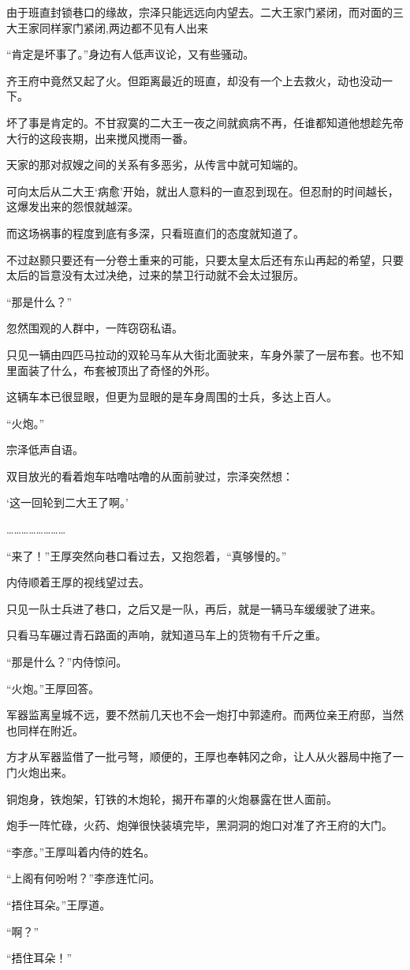 由于班直封锁巷口的缘故，宗泽只能远远向内望去。二大王家门紧闭，而对面的三大王家同样家门紧闭,两边都不见有人出来

“肯定是坏事了。”身边有人低声议论，又有些骚动。

齐王府中竟然又起了火。但距离最近的班直，却没有一个上去救火，动也没动一下。

坏了事是肯定的。不甘寂寞的二大王一夜之间就疯病不再，任谁都知道他想趁先帝大行的这段丧期，出来搅风搅雨一番。

天家的那对叔嫂之间的关系有多恶劣，从传言中就可知端的。

可向太后从二大王‘病愈’开始，就出人意料的一直忍到现在。但忍耐的时间越长，这爆发出来的怨恨就越深。

而这场祸事的程度到底有多深，只看班直们的态度就知道了。

不过赵颢只要还有一分卷土重来的可能，只要太皇太后还有东山再起的希望，只要太后的旨意没有太过决绝，过来的禁卫行动就不会太过狠厉。

“那是什么？”

忽然围观的人群中，一阵窃窃私语。

只见一辆由四匹马拉动的双轮马车从大街北面驶来，车身外蒙了一层布套。也不知里面装了什么，布套被顶出了奇怪的外形。

这辆车本已很显眼，但更为显眼的是车身周围的士兵，多达上百人。

“火炮。”

宗泽低声自语。

双目放光的看着炮车咕噜咕噜的从面前驶过，宗泽突然想：

‘这一回轮到二大王了啊。’

……………………

“来了！”王厚突然向巷口看过去，又抱怨着，“真够慢的。”

内侍顺着王厚的视线望过去。

只见一队士兵进了巷口，之后又是一队，再后，就是一辆马车缓缓驶了进来。

只看马车碾过青石路面的声响，就知道马车上的货物有千斤之重。

“那是什么？”内侍惊问。

“火炮。”王厚回答。

军器监离皇城不远，要不然前几天也不会一炮打中郭逵府。而两位亲王府邸，当然也同样在附近。

方才从军器监借了一批弓弩，顺便的，王厚也奉韩冈之命，让人从火器局中拖了一门火炮出来。

铜炮身，铁炮架，钉铁的木炮轮，揭开布罩的火炮暴露在世人面前。

炮手一阵忙碌，火药、炮弹很快装填完毕，黑洞洞的炮口对准了齐王府的大门。

“李彦。”王厚叫着内侍的姓名。

“上阁有何吩咐？”李彦连忙问。

“捂住耳朵。”王厚道。

“啊？”

“捂住耳朵！”

